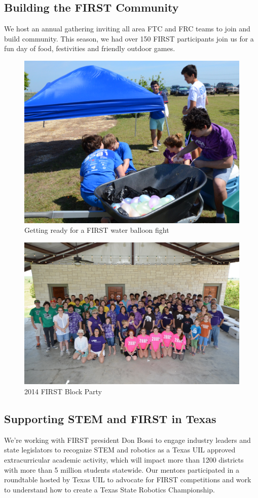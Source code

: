 \subsection{Building the FIRST Community}
We host an annual gathering inviting all area FTC and FRC teams to join and build community.  This season, we had over 150 FIRST participants join us for a fun day of food, festivities and friendly outdoor games.
\begin{figure}[H]
	\centering
	\includegraphics[width=0.6\linewidth]{community}
	\caption[]{Getting ready for a FIRST water balloon fight}
	\label{fig:community}
\end{figure}
\begin{figure}[H]
	\centering
	\includegraphics[width=0.6\linewidth]{community1}
	\caption[]{2014 FIRST Block Party }
	\label{fig:community1}
\end{figure}

\subsection{Supporting STEM and FIRST in Texas}
We’re working with FIRST president Don Bossi to engage industry leaders and state legislators to recognize STEM and robotics as a Texas UIL approved extracurricular academic activity, which will impact more than 1200 districts with more than 5 million students statewide.  Our mentors participated in a roundtable hosted by Texas UIL to advocate for FIRST competitions and work to understand how to create a Texas State Robotics Championship.

